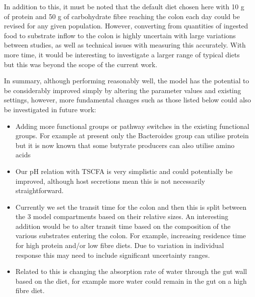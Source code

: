 \documentclass[a4paper]{article}
\begin{document}
In addition to this, it must be noted that the default diet chosen here with 10 g of protein and 50 g of carbohydrate fibre reaching the colon each day could be revised for any given population.
However, converting from quantities of ingested food to substrate inflow to the colon is highly uncertain with large variations between studies, as well as technical issues with measuring this accurately. 
With more time, it would be interesting to investigate a larger range of typical diets but this was beyond the scope of the current work.


 
In summary, although performing reasonably well, the model has the potential to be considerably improved simply by altering the parameter values and existing settings, however, more fundamental changes such as those listed below could also be investigated in future work:
\begin{itemize}
\item Adding more functional groups or pathway switches in the existing functional groups. For example at present only the Bacteroides group can utilise protein but it is now known that some butyrate producers can also utilise amino acids \citep{louis17}
\item Our pH relation with TSCFA is very simplistic and could potentially be improved, although host secretions mean this is not necessarily straightforward.
\item Currently we set the transit time for the colon and then this is split between the 3 model compartments based on their relative sizes. An interesting addition would be to alter transit time based on the composition of the various substrates entering the colon. For example, increasing residence time for high protein and/or low fibre diets. Due to variation in individual response this may need to include significant uncertainty ranges.
\item Related to this is changing the absorption rate of water through the gut wall based on the diet, for example more water could remain in the gut on a high fibre diet.
\end{itemize} 
\end{document}
